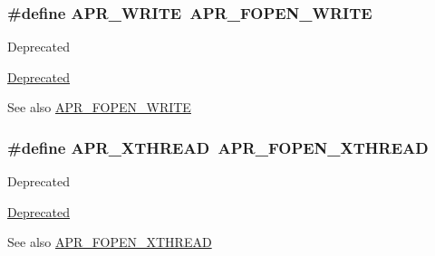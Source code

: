 \subsubsection[{\texorpdfstring{A\+P\+R\+\_\+\+W\+R\+I\+TE}{APR_WRITE}}]{\setlength{\rightskip}{0pt plus 5cm}\#define A\+P\+R\+\_\+\+W\+R\+I\+TE~{\bf A\+P\+R\+\_\+\+F\+O\+P\+E\+N\+\_\+\+W\+R\+I\+TE}}\hypertarget{group__apr__file__open__flags_ga3e427e53aceb1ccdb078d9a03cd63d01}{}\label{group__apr__file__open__flags_ga3e427e53aceb1ccdb078d9a03cd63d01}
\begin{DoxyRefDesc}{Deprecated}
\item[\hyperlink{deprecated__deprecated000025}{Deprecated}]\end{DoxyRefDesc}
\begin{DoxySeeAlso}{See also}
\hyperlink{group__apr__file__open__flags_gac598bb95fc9476b0bf2ed0b1c308842c}{A\+P\+R\+\_\+\+F\+O\+P\+E\+N\+\_\+\+W\+R\+I\+TE} 
\end{DoxySeeAlso}
\subsubsection[{\texorpdfstring{A\+P\+R\+\_\+\+X\+T\+H\+R\+E\+AD}{APR_XTHREAD}}]{\setlength{\rightskip}{0pt plus 5cm}\#define A\+P\+R\+\_\+\+X\+T\+H\+R\+E\+AD~{\bf A\+P\+R\+\_\+\+F\+O\+P\+E\+N\+\_\+\+X\+T\+H\+R\+E\+AD}}\hypertarget{group__apr__file__open__flags_gaa9120c0e395d8a0e640b5eafa8f11cce}{}\label{group__apr__file__open__flags_gaa9120c0e395d8a0e640b5eafa8f11cce}
\begin{DoxyRefDesc}{Deprecated}
\item[\hyperlink{deprecated__deprecated000033}{Deprecated}]\end{DoxyRefDesc}
\begin{DoxySeeAlso}{See also}
\hyperlink{group__apr__file__open__flags_ga435cd9b2604b11796779c23ffa00a3dd}{A\+P\+R\+\_\+\+F\+O\+P\+E\+N\+\_\+\+X\+T\+H\+R\+E\+AD} 
\end{DoxySeeAlso}
